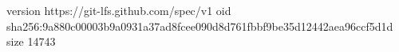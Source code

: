 version https://git-lfs.github.com/spec/v1
oid sha256:9a880c00003b9a0931a37ad8fcee090d8d761fbbf9be35d12442aea96ccf5d1d
size 14743
